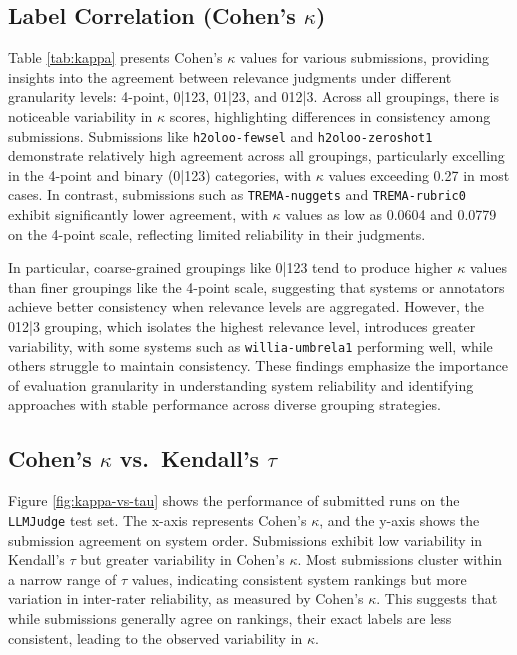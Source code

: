 \subsection{Label Correlation (Cohen's $\kappa$)}
Table \ref{tab:kappa} presents Cohen's $\kappa$ values for various submissions, providing insights into the agreement between relevance judgments under different granularity levels: 4-point, 0|123, 01|23, and 012|3. Across all groupings, there is noticeable variability in $\kappa$ scores, highlighting differences in consistency among submissions. Submissions like \texttt{h2oloo-fewsel} and \texttt{h2oloo-zeroshot1} demonstrate relatively high agreement across all groupings, particularly excelling in the 4-point and binary (0|123) categories, with $\kappa$ values exceeding 0.27 in most cases. In contrast, submissions such as \texttt{TREMA-nuggets} and \texttt{TREMA-rubric0} exhibit significantly lower agreement, with $\kappa$ values as low as 0.0604 and 0.0779 on the 4-point scale, reflecting limited reliability in their judgments.

In particular, coarse-grained groupings like 0|123 tend to produce higher $\kappa$ values than finer groupings like the 4-point scale, suggesting that systems or annotators achieve better consistency when relevance levels are aggregated. However, the 012|3 grouping, which isolates the highest relevance level, introduces greater variability, with some systems such as \texttt{willia-umbrela1} performing well, while others struggle to maintain consistency. These findings emphasize the importance of evaluation granularity in understanding system reliability and identifying approaches with stable performance across diverse grouping strategies.

\subsection{Cohen's $\kappa$ vs.~Kendall's $\tau$}
Figure \ref{fig:kappa-vs-tau} shows the performance of submitted runs on the \texttt{LLMJudge} test set. The x-axis represents Cohen's $\kappa$, and the y-axis shows the submission agreement on system order. Submissions exhibit low variability in Kendall's $\tau$ but greater variability in Cohen's $\kappa$. Most submissions cluster within a narrow range of $\tau$ values, indicating consistent system rankings but more variation in inter-rater reliability, as measured by Cohen's $\kappa$. This suggests that while submissions generally agree on rankings, their exact labels are less consistent, leading to the observed variability in $\kappa$.

